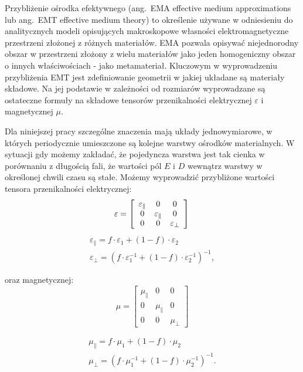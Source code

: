\label{subart:effmedium}
Przybliżenie ośrodka efektywnego (ang.~EMA effective medium approximations lub ang.~EMT effective medium theory) to określenie używane w odniesieniu do analitycznych modeli opisujących makroskopowe własności elektromagnetyczne przestrzeni złożonej z różnych materiałów. EMA pozwala opisywać niejednorodny obszar w przestrzeni złożony z wielu materiałów jako jeden homogeniczny obszar o innych właściwościach - jako metamateriał. Kluczowym w wyprowadzeniu przybliżenia EMT jest zdefiniowanie geometrii w jakiej układane są materiały składowe. Na jej podstawie w zależności od rozmiarów wyprowadzane są ostateczne formuły na składowe tensorów przenikalności elektrycznej $\varepsilon$ i magnetycznej $\mu$.

Dla niniejszej pracy szczególne znaczenia mają układy jednowymiarowe, w których periodycznie umieszczone są kolejne warstwy ośrodków materialnych. W sytuacji gdy możemy zakładać, że pojedyncza warstwa jest tak cienka w porównaniu z długością fali, że wartości pól $E$ i $D$ wewnątrz warstwy w określonej chwili czasu są stałe. Możemy wyprowadzić przybliżone wartości tensora przenikalności elektrycznej:
\[ \varepsilon= \left[ \begin{array}{ccc}
	\varepsilon_{\parallel} & 0 & 0 \\
	0 & \varepsilon_{\parallel} & 0 \\
	0 & 0 &  \varepsilon_{\perp} \end{array} \right] 
\\
\]
\begin{equation}
	\begin{gathered}
		\varepsilon_{\parallel}=f\cdot{\varepsilon_1}+(1-f)\cdot \varepsilon_2 \\ 
		\varepsilon_{\perp}=\left(f\cdot{\varepsilon_1^{-1}}+(1-f)\cdot \varepsilon_2^{-1}\right)^{-1},
	\end{gathered}
\label{eq:effmedium}
\end{equation}


oraz magnetycznej:
\[ \mu= \left[ \begin{array}{ccc}
					\mu_{\parallel} & 0 & 0 \\
					0 & \mu_{\parallel} & 0 \\
					0 & 0 &  \mu_{\perp} \end{array} \right]
\]

\begin{equation}
	\begin{gathered}
		\mu_{\parallel}=f\cdot{\mu_1}+(1-f)\cdot \mu_2 \\
		\mu_{\perp}=\left(f\cdot{\mu_1^{-1}}+(1-f)\cdot \mu_2^{-1}\right)^{-1}.
	\end{gathered}
\label{eq:effmedium-mu}
\end{equation}

